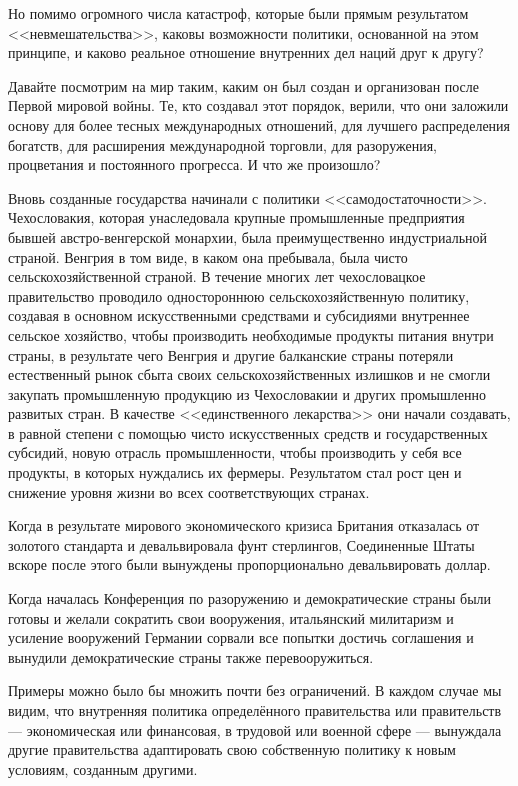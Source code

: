 Но помимо огромного числа катастроф, которые были прямым результатом <<невмешательства>>, каковы возможности политики, основанной на этом принципе, и каково реальное отношение внутренних дел наций друг к другу?
 
Давайте посмотрим на мир таким, каким он был создан и организован после Первой мировой войны. Те, кто создавал этот порядок, верили, что они заложили основу для более тесных международных отношений, для лучшего распределения богатств, для расширения международной торговли, для разоружения, процветания и постоянного прогресса. И что же произошло?

Вновь созданные государства начинали с политики <<самодостаточности>>. Чехословакия, которая унаследовала крупные промышленные предприятия бывшей австро-венгерской монархии, была преимущественно индустриальной страной. Венгрия в том виде, в каком она пребывала, была чисто сельскохозяйственной страной. В течение многих лет чехословацкое правительство проводило одностороннюю сельскохозяйственную политику, создавая в основном искусственными средствами и субсидиями внутреннее сельское хозяйство, чтобы производить необходимые продукты питания внутри страны, в результате чего Венгрия и другие балканские страны потеряли естественный рынок сбыта своих сельскохозяйственных излишков и не смогли закупать промышленную продукцию из Чехословакии и других промышленно развитых стран. В качестве <<единственного лекарства>> они начали создавать, в равной степени с помощью чисто искусственных средств и государственных субсидий, новую отрасль промышленности, чтобы производить у себя все продукты, в которых нуждались их фермеры. Результатом стал рост цен и снижение уровня жизни во всех соответствующих странах.
 
Когда в результате мирового экономического кризиса Британия отказалась от золотого стандарта и девальвировала фунт стерлингов, Соединенные Штаты вскоре после этого были вынуждены пропорционально девальвировать доллар.

Когда началась Конференция по разоружению и демократические страны были готовы и желали сократить свои вооружения, итальянский милитаризм и усиление вооружений Германии сорвали все попытки достичь соглашения и вынудили демократические страны также перевооружиться.
 
Примеры можно было бы множить почти без ограничений. В каждом случае мы видим, что внутренняя политика определённого правительства или правительств — экономическая или финансовая, в трудовой или военной сфере — вынуждала другие правительства адаптировать свою собственную политику к новым условиям, созданным другими.

